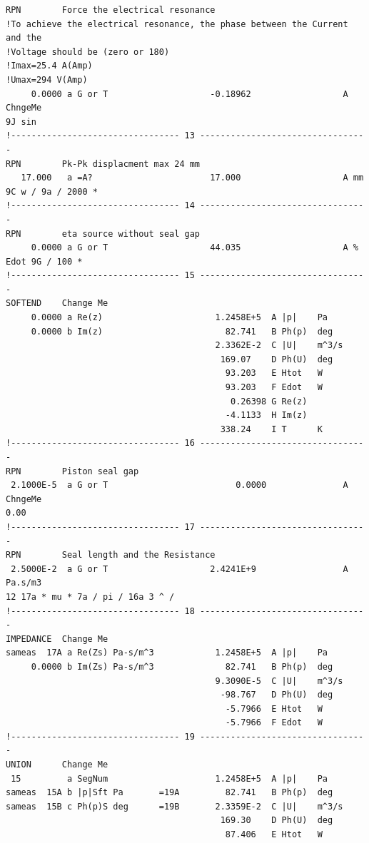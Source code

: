 \begin{linenumbers}
\begin{verbatim}
RPN        Force the electrical resonance
!To achieve the electrical resonance, the phase between the Current and the
!Voltage should be (zero or 180)
!Imax=25.4 A(Amp)
!Umax=294 V(Amp)
     0.0000 a G or T                    -0.18962                  A ChngeMe
9J sin
!--------------------------------- 13 ---------------------------------
RPN        Pk-Pk displacment max 24 mm
   17.000   a =A?                       17.000                    A mm
9C w / 9a / 2000 *
!--------------------------------- 14 ---------------------------------
RPN        eta source without seal gap
     0.0000 a G or T                    44.035                    A %
Edot 9G / 100 *
!--------------------------------- 15 ---------------------------------
SOFTEND    Change Me
     0.0000 a Re(z)                      1.2458E+5  A |p|    Pa
     0.0000 b Im(z)                        82.741   B Ph(p)  deg
                                         2.3362E-2  C |U|    m^3/s
                                          169.07    D Ph(U)  deg
                                           93.203   E Htot   W
                                           93.203   F Edot   W
                                            0.26398 G Re(z)
                                           -4.1133  H Im(z)
                                          338.24    I T      K
!--------------------------------- 16 ---------------------------------
RPN        Piston seal gap
 2.1000E-5  a G or T                         0.0000               A ChngeMe
0.00
!--------------------------------- 17 ---------------------------------
RPN        Seal length and the Resistance
 2.5000E-2  a G or T                    2.4241E+9                 A Pa.s/m3
12 17a * mu * 7a / pi / 16a 3 ^ /
!--------------------------------- 18 ---------------------------------
IMPEDANCE  Change Me
sameas  17A a Re(Zs) Pa-s/m^3            1.2458E+5  A |p|    Pa
     0.0000 b Im(Zs) Pa-s/m^3              82.741   B Ph(p)  deg
                                         9.3090E-5  C |U|    m^3/s
                                          -98.767   D Ph(U)  deg
                                           -5.7966  E Htot   W
                                           -5.7966  F Edot   W
!--------------------------------- 19 ---------------------------------
UNION      Change Me
 15         a SegNum                     1.2458E+5  A |p|    Pa
sameas  15A b |p|Sft Pa       =19A         82.741   B Ph(p)  deg
sameas  15B c Ph(p)S deg      =19B       2.3359E-2  C |U|    m^3/s
                                          169.30    D Ph(U)  deg
                                           87.406   E Htot   W

\end{verbatim}
\end{linenumbers}

